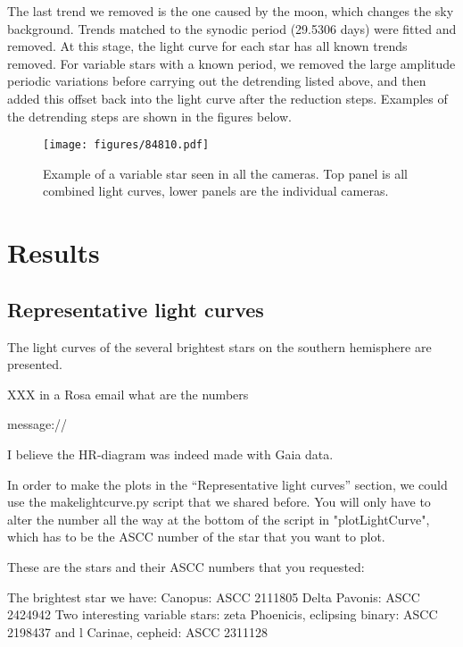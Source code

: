 \documentclass{aa}
\begin{document}
The last trend we removed is the one caused by the moon, which changes the sky background.
%
Trends matched to the synodic period (29.5306 days) were fitted and removed.
%
At this stage, the light curve for each star has all known trends removed.
%
For variable stars with a known period, we removed the large amplitude periodic variations before carrying out the detrending listed above, and then added this offset back into the light curve after the reduction steps.
%
Examples of the detrending steps are shown in the figures below.


\begin{figure*}
    \centering
    \texttt{[image: figures/84810.pdf]}
    \caption{Example of a variable star seen in all the cameras.
    Top panel is all combined light curves, lower panels are the individual cameras.}
    \label{fig:cleaned_output}
\end{figure*}

\section{Results}
\label{sec:results}

\subsection{Representative light curves}
The light curves of the several brightest stars on the southern hemisphere are presented.

XXX in a Rosa email what are the numbers

message://%

I believe the HR-diagram was indeed made with Gaia data.

In order to make the plots in the ``Representative light curves'' section, we could use the makelightcurve.py script that we shared before. You will only have to alter the number all the way at the bottom of the script in "plotLightCurve", which has to be the ASCC number of the star that you want to plot.

These are the stars and their ASCC numbers that you requested:

The brightest star we have: Canopus: ASCC 2111805
Delta Pavonis: ASCC 2424942
Two interesting variable stars: zeta Phoenicis, eclipsing binary: ASCC 2198437
and l Carinae, cepheid: ASCC 2311128
\end{document}
